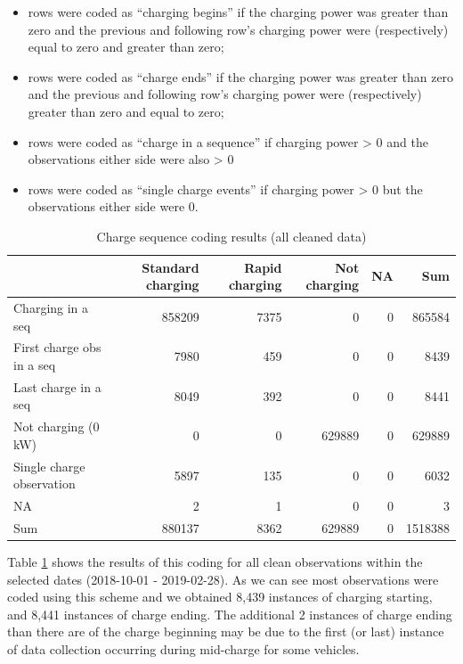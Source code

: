 \documentclass[]{article}
\providecommand{\tightlist}{%
  \setlength{\itemsep}{0pt}\setlength{\parskip}{0pt}}
\begin{document}
\begin{itemize}
\tightlist
\item
  rows were coded as ``charging begins'' if the charging power was greater than zero and the previous and following row's charging power were (respectively) equal to zero and greater than zero;
\item
  rows were coded as ``charge ends'' if the charging power was greater than zero and the previous and following row's charging power were (respectively) greater than zero and equal to zero;
\item
  rows were coded as ``charge in a sequence'' if charging power \textgreater{} 0 and the observations either side were also \textgreater{} 0
\item
  rows were coded as ``single charge events'' if charging power \textgreater{} 0 but the observations either side were 0.
\end{itemize}

\begin{table}[t]

\caption{\label{tab:seqCodeTable}Charge sequence coding results (all cleaned data)}
\centering
\begin{tabular}{l|r|r|r|r|r}
\hline
  & Standard charging & Rapid charging & Not charging & NA & Sum\\
\hline
Charging in a seq & 858209 & 7375 & 0 & 0 & 865584\\
\hline
First charge obs in a seq & 7980 & 459 & 0 & 0 & 8439\\
\hline
Last charge in a seq & 8049 & 392 & 0 & 0 & 8441\\
\hline
Not charging (0 kW) & 0 & 0 & 629889 & 0 & 629889\\
\hline
Single charge observation & 5897 & 135 & 0 & 0 & 6032\\
\hline
NA & 2 & 1 & 0 & 0 & 3\\
\hline
Sum & 880137 & 8362 & 629889 & 0 & 1518388\\
\hline
\end{tabular}
\end{table}

Table \ref{tab:seqCodeTable} shows the results of this coding for all clean observations within the selected dates (2018-10-01 - 2019-02-28). As we can see most observations were coded using this scheme and we obtained 8,439 instances of charging starting, and 8,441 instances of charge ending. The additional 2 instances of charge ending than there are of the charge beginning may be due to the first (or last) instance of data collection occurring during mid-charge for some vehicles.
\end{document}
